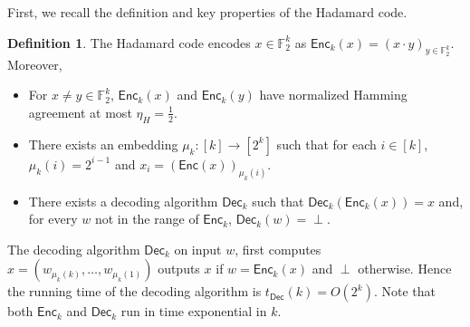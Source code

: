 \documentclass[10pt,a4paper]{article}
\theoremstyle{plain}
\theoremstyle{definition}
\newtheorem{definition}[theorem]{Definition}
\newcommand{\1}{\mathbb{1}} %
\newcommand{\bF}{\mathbb{F}}
\newcommand{\Enc}{\mathsf{Enc}}
\newcommand{\Dec}{\mathsf{Dec}}
\begin{document}
First, we recall the definition and key properties of the Hadamard code.
\begin{definition}
    The Hadamard code encodes $x \in \bF_2^k$ as $\Enc_k(x) = (x\cdot y)_{y \in \bF_2^k}$. Moreover,
    \begin{itemize}
        \item For $x \neq y \in \bF_2^k$, $\Enc_k(x)$ and $\Enc_k(y)$ have normalized Hamming agreement at most $\eta_H = \frac{1}{2}$.
        \item There exists an embedding $\mu_k: [k] \to [2^k]$ such that for each $i \in [k]$, $\mu_k(i) = 2^{i-1}$ and $x_i = (\Enc(x))_{\mu_k(i)}$.
        \item There exists a decoding algorithm $\Dec_k$ such that $\Dec_k(\Enc_k(x)) = x$ and, for every $w$ not in the range of $\Enc_k$, $\Dec_k(w) = \perp$.
    \end{itemize}
\end{definition}
The decoding algorithm $\Dec_k$ on input $w$, first computes $x = (w_{\mu_k(k)},\ldots,w_{\mu_k(1)})$
outputs $x$ if $w = \Enc_k(x)$ and $\perp$ otherwise.
Hence the running time of the decoding algorithm is $t_{\Dec}(k) = O(2^k).$
Note that both $\Enc_k$ and $\Dec_k$ run in time exponential in $k$.
\end{document}
